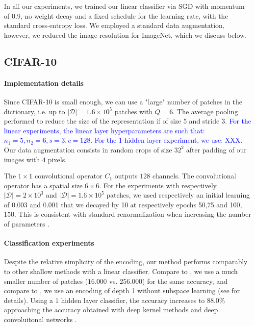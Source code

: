 \documentclass{article}
\newcommand{\Edouard}[1]{\textcolor{blue}{#1}}
\begin{document}
{In all our experiments, we trained our linear classifier via SGD with momentum of 0.9, no weight decay and a fixed schedule for the learning rate, with the standard cross-entropy loss. We employed a standard data augmentation, however, we reduced the image resolution for ImageNet, which we discuss below.



\subsection{CIFAR-10}

 \paragraph{Implementation details}Since CIFAR-10 is small enough, we can use a "large" number of patches in the dictionary, i.e. up to $|\mathcal{D}|=1.6\times10^5$ patches with $Q = 6$.
The average pooling performed to reduce the size of the representation if of size $5$ and stride $3$. \Edouard{For the linear experiments, the linear layer hyperparameters are such that: $n_1=5, n_2=6,s=3,c=128$. For the 1-hidden layer experiment, we use: XXX}.
Our data augmentation consists in random crops of size $32^2$ after  padding of our images with $4$ pixels.

The $1 \times 1$ convolutional operator $C_1$ outputs $128$ channels.
The convolutional operator has a spatial size $6 \times 6$.
For the experiments with respectively $|\mathcal{D}|=2\times 10^3$ and $|\mathcal{D}|=1.6\times 10^5$ patches, we used respectively an initial learning of 0.003 and 0.001 that we decayed by 10 at respectively epochs 50,75 and 100, 150. This is consistent with standard renormalization when increasing the number of parameters \cite{trouver une citation, on dirait un sqrt(10) facteur qui indique la loss a pas été renormalisé, à vérifier}.


\paragraph{Classification experiments} Despite the relative simplicity of the encoding, our method performs comparably to other shallow methods with a linear classifier.
Compare to \cite{recht2019imagenet},  we use a much smaller number of patches ($16.000$ vs. $256.000$) for the same accuracy, and compare to \cite{mairal2016end}, we use an encoding of depth 1 without subspace learning (see \cite{mairal2016end} for details).
Using a 1 hidden layer classifier, the accuracy increases to $88.0 \%$ approaching the accuracy obtained with deep kernel methods \citep{li2019enhanced,shankar2020neural} and deep convoluitonal networks \citep{krizhevsky2012imagenet}.



}
\end{document}
